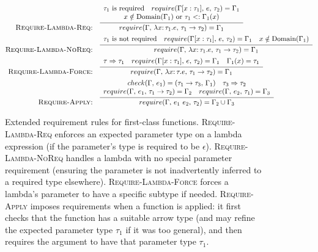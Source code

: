 \documentclass[peerreview, 10pt]{IEEEtran}
\newcommand{\funct}[3]{\ensuremath{\lambda #1\mathsf{:}\,#2.#3}}
\newcommand{\apply}[2]{\ensuremath{#1\ #2}}
\newcommand{\arrowt}[2]{\ensuremath{{#1}\rightarrow{#2}}}
\newcommand{\checktype}[4]{\ensuremath{{check}(#1,\,#2)=(#3,\,#4)}}
\newcommand{\requiretype}[4]{\ensuremath{{require}(#1,\,#2,\,#3)=#4}}
\newcommand{\required}[1]{\ensuremath{#1\text{ is required}}}
\newcommand{\nrequired}[1]{\ensuremath{#1\text{ is not required}}}
\newcommand{\forcerequire}[2]{\ensuremath{#1\Rightarrow#2}}
\begin{document}
\begin{figure*}[ht]
\centering
\begin{framed}
\begin{align*}
\text{\textsc{Require-Lambda-Req:}} &\quad \infer{\requiretype{\Gamma}{\funct{x}{\tau_1}{e}}{\arrowt{\tau_1}{\tau_2}}{\Gamma_1}}{
\begin{array}{c}
\required{\tau_1} \quad \requiretype{\Gamma[x:\tau_1]}{e}{\tau_2}{\Gamma_1}\\
x \notin \text{Domain}(\Gamma_1) \text{ or } \tau_1 <: \Gamma_1(x)
\end{array}} \\
\text{\textsc{Require-Lambda-NoReq:}} &\quad \infer{\requiretype{\Gamma}{\funct{x}{\tau_1}{e}}{\arrowt{\tau_1}{\tau_2}}{\Gamma_1}}{
\begin{array}{c}
\nrequired{\tau_1} \quad
\requiretype{\Gamma[x:\tau_1]}{e}{\tau_2}{\Gamma_1} \quad x \notin \text{Domain}(\Gamma_1)
\end{array}
} \\
\text{\textsc{Require-Lambda-Force:}} &\quad \infer{\requiretype{\Gamma}{\funct{x}{\tau}{e}}{\arrowt{\tau_1}{\tau_2}}{\Gamma_1}}{
\begin{array}{c}
\forcerequire{\tau}{\tau_1} \quad \requiretype{\Gamma[x:\tau_1]}{e}{\tau_2}{\Gamma_1} \quad \Gamma_1(x) = \tau_1
\end{array}
} \\
\text{\textsc{Require-Apply:}} &\quad \infer{\requiretype{\Gamma}{\apply{e_1}{e_2}}{\tau_2}{\Gamma_2 \cup \Gamma_3}}{
\begin{array}{c}
\checktype{\Gamma}{e_1}{\arrowt{\tau_1}{\tau_3}}{\Gamma_1} \quad \forcerequire{\tau_3}{\tau_2}\\
\requiretype{\Gamma}{e_1}{\arrowt{\tau_1}{\tau_2}}{\Gamma_2} \quad \requiretype{\Gamma}{e_2}{\tau_1}{\Gamma_3}
\end{array}
}
\end{align*}
\end{framed}
\caption{Extended requirement rules for first-class functions. \textsc{Require-Lambda-Req} enforces an expected parameter type on a lambda expression (if the parameter's type is required to be $\epsilon$). \textsc{Require-Lambda-NoReq} handles a lambda with no special parameter requirement (ensuring the parameter is not inadvertently inferred to a required type elsewhere). \textsc{Require-Lambda-Force} forces a lambda's parameter to have a specific subtype if needed. \textsc{Require-Apply} imposes requirements when a function is applied: it first checks that the function has a suitable arrow type (and may refine the expected parameter type $\tau_1$ if it was too general), and then requires the argument to have that parameter type $\tau_1$.}
\label{fig:function-require-rules}
\end{figure*}
\end{document}
